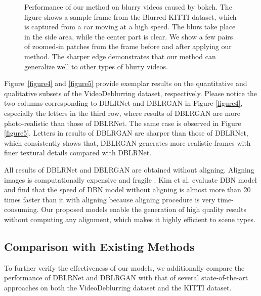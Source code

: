 \documentclass[journal]{IEEEtran}
\begin{document}
\begin{figure*}[tb]
\centering
{}
\caption{Performance of our method on blurry videos caused by bokeh. The figure shows a sample frame from the Blurred KITTI dataset, which is captured from a car moving at a high speed. The blurs take place in the side area, while the center part is clear. We show a few pairs of zoomed-in patches from the frame before and after applying our method. The sharper edge demonstrates that our method can generalize well to other types of blurry videos.}
 \label{figure6}
\end{figure*}



Figure~\ref{figure4} and \ref{figure5} provide exemplar results on the quantitative and qualitative subsets of the VideoDeblurring dataset, respectively. Please notice the two columns corresponding to DBLRNet and DBLRGAN in Figure \ref{figure4}, especially the letters in the third row, where results of DBLRGAN are more photo-realistic than those of DBLRNet. The same case is observed in Figure \ref{figure5}. Letters in results of DBLRGAN are sharper than those of DBLRNet, which consistently shows that, DBLRGAN generates more realistic frames with finer textural details compared with DBLRNet.

All results of DBLRNet and DBLRGAN are obtained without aligning. Aligning images is computationally expensive and fragile \cite{su2016deep}. Kim et al. \cite{kim2017online} evaluate DBN model and find that the speed of DBN model without aligning is almost more than 20 times faster than it with aligning because aligning procedure is very time-consuming. Our proposed models enable the generation of high quality results without computing any alignment, which makes it highly efficient to scene types.


\subsection{Comparison with Existing Methods}
To further verify the effectiveness of our models, we additionally compare the performance of DBLRNet and DBLRGAN with that of several state-of-the-art approaches on both the VideoDeblurring dataset and the KITTI dataset.
\end{document}
